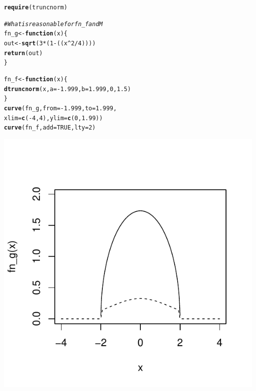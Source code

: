 \documentclass{article}\usepackage[]{graphicx}\usepackage[]{color}
\makeatletter
\def\maxwidth{ %
  \ifdim\Gin@nat@width>\linewidth
    \linewidth
  \else
    \Gin@nat@width
  \fi
}
\newcommand{\hlnum}[1]{\textcolor[rgb]{0.686,0.059,0.569}{#1}}%
\newcommand{\hlcom}[1]{\textcolor[rgb]{0.678,0.584,0.686}{\textit{#1}}}%
\newcommand{\hlopt}[1]{\textcolor[rgb]{0,0,0}{#1}}%
\newcommand{\hlstd}[1]{\textcolor[rgb]{0.345,0.345,0.345}{#1}}%
\newcommand{\hlkwa}[1]{\textcolor[rgb]{0.161,0.373,0.58}{\textbf{#1}}}%
\newcommand{\hlkwb}[1]{\textcolor[rgb]{0.69,0.353,0.396}{#1}}%
\newcommand{\hlkwc}[1]{\textcolor[rgb]{0.333,0.667,0.333}{#1}}%
\newcommand{\hlkwd}[1]{\textcolor[rgb]{0.737,0.353,0.396}{\textbf{#1}}}%
\newenvironment{kframe}{%
 \def\at@end@of@kframe{}%
 \ifinner\ifhmode%
  \def\at@end@of@kframe{\end{minipage}}%
  \begin{minipage}{\columnwidth}%
 \fi\fi%
 \def\FrameCommand##1{\hskip\@totalleftmargin \hskip-\fboxsep
 \colorbox{shadecolor}{##1}\hskip-\fboxsep
     \hskip-\linewidth \hskip-\@totalleftmargin \hskip\columnwidth}%
 \MakeFramed {\advance\hsize-\width
   \@totalleftmargin\z@ \linewidth\hsize
   \@setminipage}}%
 {\par\unskip\endMakeFramed%
 \at@end@of@kframe}
\makeatother
\begin{document}
\begin{enumerate}
\begin{kframe}
\begin{alltt}
\hlkwd{require}\hlstd{(truncnorm)}

\hlcom{# What is reasonable for fn_f and M}
\hlstd{fn_g} \hlkwb{<-} \hlkwa{function}\hlstd{(}\hlkwc{x}\hlstd{)\{}
  \hlstd{out} \hlkwb{<-} \hlkwd{sqrt}\hlstd{(}\hlnum{3}\hlopt{*}\hlstd{(}\hlnum{1}\hlopt{-}\hlstd{((x}\hlopt{^}\hlnum{2}\hlopt{/}\hlnum{4}\hlstd{))))}
  \hlkwd{return}\hlstd{(out)}
\hlstd{\}}

\hlstd{fn_f} \hlkwb{<-} \hlkwa{function}\hlstd{(}\hlkwc{x}\hlstd{)\{}
  \hlkwd{dtruncnorm}\hlstd{(x,}\hlkwc{a}\hlstd{=}\hlopt{-}\hlnum{1.999}\hlstd{,}\hlkwc{b}\hlstd{=}\hlnum{1.999}\hlstd{,}\hlnum{0}\hlstd{,}\hlnum{1.5}\hlstd{)}
\hlstd{\}}
\hlkwd{curve}\hlstd{(fn_g,} \hlkwc{from} \hlstd{=} \hlopt{-}\hlnum{1.999}\hlstd{,} \hlkwc{to} \hlstd{=} \hlnum{1.999}\hlstd{,}
      \hlkwc{xlim} \hlstd{=} \hlkwd{c}\hlstd{(}\hlopt{-}\hlnum{4}\hlstd{,}\hlnum{4}\hlstd{),} \hlkwc{ylim} \hlstd{=} \hlkwd{c}\hlstd{(}\hlnum{0}\hlstd{,}\hlnum{1.99}\hlstd{))}
\hlkwd{curve}\hlstd{(fn_f,} \hlkwc{add}\hlstd{=}\hlnum{TRUE}\hlstd{,} \hlkwc{lty}\hlstd{=}\hlnum{2}\hlstd{)}
\end{alltt}
\end{kframe}

{\centering \includegraphics[width=\maxwidth]{figure/prob5-1} 

}
\end{enumerate}
\end{document}
